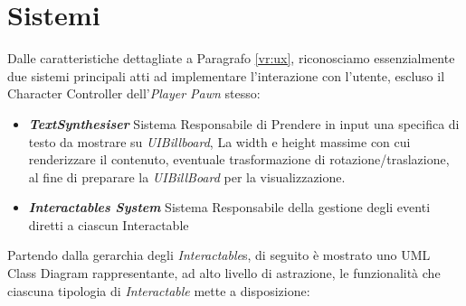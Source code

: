 \documentclass[10pt, openany]{article}
\begin{document}
  \section{Sistemi}
  Dalle caratteristiche dettagliate a Paragrafo \ref{vr:ux}, riconosciamo essenzialmente due sistemi principali atti ad implementare l'interazione con l'utente, escluso il Character
  Controller dell'\textit{Player Pawn} stesso:
  \begin{itemize}[noitemsep, topsep=0pt]
    \item \textbf{\textit{TextSynthesiser}} Sistema Responsabile di Prendere in input una specifica di testo da mostrare su \textit{UIBillboard}, La width e height massime con cui 
      renderizzare il contenuto, eventuale trasformazione di rotazione/traslazione, al fine di preparare la \textit{UIBillBoard} per la visualizzazione.
    \item \textbf{\textit{Interactables System}} Sistema Responsabile della gestione degli eventi diretti a ciascun Interactable 
  \end{itemize}
  Partendo dalla gerarchia degli \textit{Interactable}s, di seguito \`e mostrato uno UML Class Diagram rappresentante, ad alto livello di astrazione, le funzionalit\`a che ciascuna 
  tipologia di \textit{Interactable} mette a disposizione:
\end{document}

